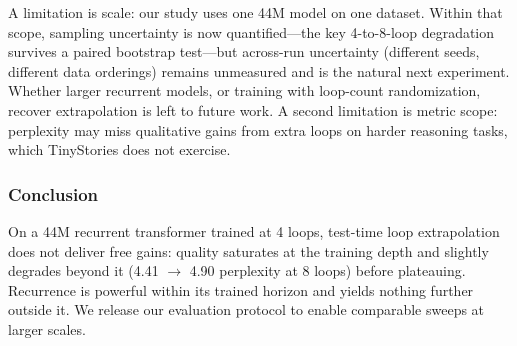 A limitation is scale: our study uses one 44M model on one dataset.
Within that scope, sampling uncertainty is now quantified---the key
4-to-8-loop degradation survives a paired bootstrap test---but
across-run uncertainty (different seeds, different data orderings)
remains unmeasured and is the natural next experiment.
Whether larger recurrent models, or training with loop-count
randomization, recover extrapolation is left to future work. A second
limitation is metric scope: perplexity may miss qualitative gains from
extra loops on harder reasoning tasks, which TinyStories does not
exercise.

\subsubsection{Conclusion}

On a 44M recurrent transformer trained at 4 loops, test-time loop
extrapolation does not deliver free gains: quality saturates at the
training depth and slightly degrades beyond it (4.41 $\rightarrow$
4.90 perplexity at 8 loops) before plateauing.
Recurrence is powerful within its trained horizon and yields nothing
further outside it.
We release our evaluation protocol to enable comparable sweeps at
larger scales.
